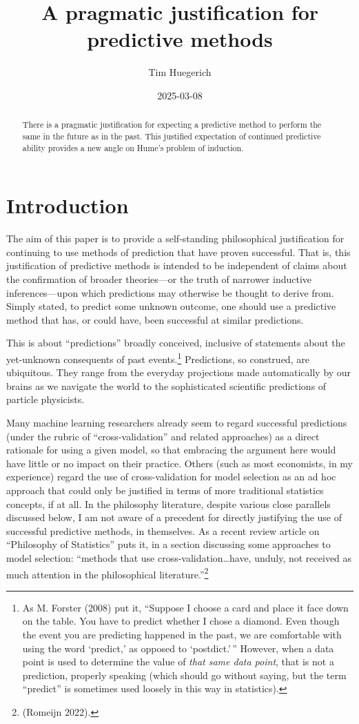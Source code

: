 \documentclass[
  letterpaper,
  DIV=11,
  numbers=noendperiod]{scrartcl}
\title{A pragmatic justification for predictive methods}
\author{Tim Huegerich}
\date{2025-03-08}
\theoremstyle{definition}
\theoremstyle{remark}
\begin{document}
\maketitle
\begin{abstract}
There is a pragmatic justification for expecting a predictive method to
perform the same in the future as in the past. This justified
expectation of continued predictive ability provides a new angle on
Hume's problem of induction.
\end{abstract}


\section{Introduction}\label{introduction}

The aim of this paper is to provide a self-standing philosophical
justification for continuing to use methods of prediction that have
proven successful. That is, this justification of predictive methods is
intended to be independent of claims about the confirmation of broader
theories---or the truth of narrower inductive inferences---upon which
predictions may otherwise be thought to derive from. Simply stated, to
predict some unknown outcome, one should use a predictive method that
has, or could have, been successful at similar predictions.

This is about ``predictions'' broadly conceived, inclusive of statements
about the yet-unknown consequents of past events.\footnote{As M. Forster
  (2008) put it, ``Suppose I choose a card and place it face down on the
  table. You have to predict whether I chose a diamond. Even though the
  event you are predicting happened in the past, we are comfortable with
  using the word `predict,' as opposed to `postdict.'\,'' However, when
  a data point is used to determine the value of \emph{that same data
  point}, that is not a prediction, properly speaking (which should go
  without saying, but the term ``predict'' is sometimes used loosely in
  this way in statistics).} Predictions, so construed, are ubiquitous.
They range from the everyday projections made automatically by our
brains as we navigate the world to the sophisticated scientific
predictions of particle physicists.

Many machine learning researchers already seem to regard successful
predictions (under the rubric of ``cross-validation'' and related
approaches) as a direct rationale for using a given model, so that
embracing the argument here would have little or no impact on their
practice. Others (such as most economists, in my experience) regard the
use of cross-validation for model selection as an ad hoc approach that
could only be justified in terms of more traditional statistics
concepts, if at all. In the philosophy literature, despite various close
parallels discussed below, I am not aware of a precedent for directly
justifying the use of successful predictive methods, in themselves. As a
recent review article on ``Philosophy of Statistics'' puts it, in a
section discussing some approaches to model selection: ``methods that
use cross-validation\ldots have, unduly, not received as much attention
in the philosophical literature.''\footnote{(Romeijn 2022).}
\end{document}
